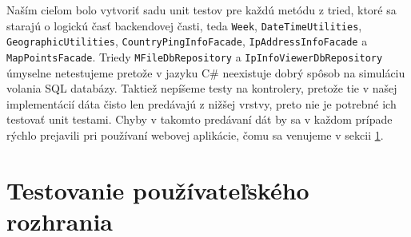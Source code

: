 Naším cieľom bolo vytvoriť sadu unit testov pre každú metódu z tried, ktoré sa starajú o logickú časť backendovej časti, teda \lstinline{Week}, 
\lstinline{DateTimeUtilities}, \lstinline{GeographicUtilities}, \lstinline{CountryPingInfoFacade}, \lstinline{IpAddressInfoFacade} a \lstinline{MapPointsFacade}.
Triedy \lstinline{MFileDbRepository} a \lstinline{IpInfoViewerDbRepository} úmyselne netestujeme pretože v jazyku C\# neexistuje dobrý spôsob na simuláciu 
volania SQL databázy. Taktiež nepíšeme testy na kontrolery, pretože tie v našej implementácií dáta čisto len predávajú z nižšej vrstvy, preto nie je potrebné 
ich testovať unit testami. Chyby v takomto predávaní dát by sa v každom prípade rýchlo prejavili pri používaní webovej aplikácie, čomu sa venujeme v sekcii 
\ref{test_interface}.

\section{Testovanie používateľského rozhrania}
\label{test_interface}